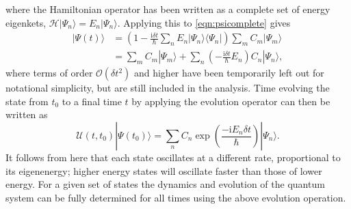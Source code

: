 where the Hamiltonian operator has been written as a complete set of energy eigenkets, $\mathcal{H}|\Psi_n\rangle = E_n|\Psi_n\rangle$. Applying this to \eqref{eqn:psicomplete} gives
\begin{subequations}
    \begin{align}
        |\Psi (t) \rangle &= \left( 1 - \frac{\textrm{i}\delta t}{\hbar}\displaystyle\sum\limits_{n}E_n|\Psi_n\rangle\langle \Psi_n |  \right)\displaystyle\sum\limits_{m} C_m |\Psi_m \rangle \\
            &= \displaystyle\sum\limits_{m} C_m |\Psi_m \rangle + \displaystyle\sum\limits_{n}\left( - \frac{\textrm{i}\delta t}{\hbar}E_n \right) C_n|\Psi_n\rangle,
    \end{align}
\end{subequations}
where terms of order $\mathcal{O}(\delta t^2)$ and higher have been temporarily left out for notational simplicity, but are still included in the analysis. Time evolving the state from $t_0$ to a final time $t$ by applying the evolution operator can then be written as
\begin{equation}
   \mathscr{U}(t,t_0)|\Psi(t_0) \rangle = \displaystyle\sum\limits_{n} C_n \exp\left(\frac{-\textrm{i}{E_n}\delta t}{\hbar}\right)|\Psi_n \rangle.
\end{equation}
It follows from here that each state oscillates at a different rate, proportional to its eigenenergy; higher energy states will oscillate faster than those of lower energy. For a given set of states the dynamics and evolution of the quantum system can be fully determined for all times using the above evolution operation.

